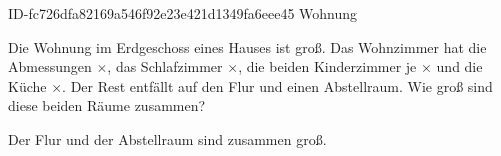 \begin{exercise}
      {ID-fc726dfa82169a546f92e23e421d1349fa6eee45}
      {Wohnung}
  \ifproblem\problem\par
    Die Wohnung im Erdgeschoss eines Hauses ist  groß.
    Das Wohnzimmer hat die Abmessungen $\times$,
    das Schlafzimmer $\times$,
    die beiden Kinderzimmer je $\times$
    und die Küche $\times$.
    Der Rest entfällt auf den Flur und einen Abstellraum. Wie groß sind
    diese beiden Räume zusammen?
  \fi
  \ifoutcome\outcome\par
    Der Flur und der Abstellraum sind zusammen  groß.
  \fi
\end{exercise}
